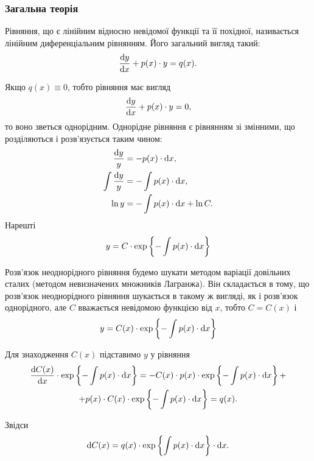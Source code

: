\subsubsection{Загальна теорія}

Рівняння, що є лінійним відносно невідомої функції та її похідної, називається лінійним диференціальним рівнянням. Його загальний вигляд такий:
\begin{equation}
	\label{eq:1.3.1}
	\frac{\mathop{}\!\mathrm{d} y}{\mathop{}\!\mathrm{d} x} + p(x) \cdot y = q(x).
\end{equation}

Якщо $q(x) \equiv 0$, тобто рівняння має вигляд
\begin{equation}
	\label{eq:1.3.2}
	\frac{\mathop{}\!\mathrm{d} y}{\mathop{}\!\mathrm{d} x} + p(x) \cdot y = 0,
\end{equation}
то воно зветься однорідним. Однорідне рівняння є рівнянням зі змінними, що розділяються і розв’язується таким чином:
\begin{align}
	\label{eq:1.3.2_25}
	\frac{\mathop{}\!\mathrm{d} y}{y} &= -p(x) \cdot \mathop{}\!\mathrm{d} x, \\
	\int \frac{\mathop{}\!\mathrm{d} y}{y} &= - \int p(x) \cdot \mathop{}\!\mathrm{d} x, \\
	\ln y &= - \int p(x) \cdot \mathop{}\!\mathrm{d} x + \ln C.
\end{align}
Нарешті 
\begin{equation}
	\label{eq:1.3.2_5}
	y = C \cdot \exp \left\{ - \int p(x) \cdot \mathop{}\!\mathrm{d} x \right\}
\end{equation}

Розв’язок неоднорідного рівняння будемо шукати методом варіації довільних сталих (методом невизначених множників Лагранжа). Він складається в тому, що розв’язок неоднорідного рівняння шукається в такому ж вигляді, як і розв’язок однорідного, але $C$ вважається невідомою функцією від $x$, тобто $C = C(x)$ і 
\begin{equation}
	\label{eq:1.3.2_75}
	y = C(x) \cdot \exp \left\{ - \int p(x) \cdot \mathop{}\!\mathrm{d} x \right\}	
\end{equation}

Для знаходження $C(x)$ підставимо $y$ у рівняння
\begin{multline} 
	\label{eq:1.3.3}
	\frac{\mathop{}\!\mathrm{d} C(x)}{\mathop{}\!\mathrm{d} x} \cdot \exp \left\{ - \int p(x) \cdot \mathop{}\!\mathrm{d} x \right\} = - C(x) \cdot p(x) \cdot \exp \left\{ - \int p(x) \cdot \mathop{}\!\mathrm{d} x \right\} + \\
	+ p(x) \cdot C(x) \cdot \exp \left\{ - \int p(x) \cdot \mathop{}\!\mathrm{d} x \right\} = q(x).
\end{multline}

Звідси
\begin{equation} 
	\label{eq:1.3.4}
	\mathop{}\!\mathrm{d} C(x) = q(x) \cdot \exp \left\{\int p(x) \cdot \mathop{}\!\mathrm{d} x \right\} \cdot \mathop{}\!\mathrm{d} x.
\end{equation}

